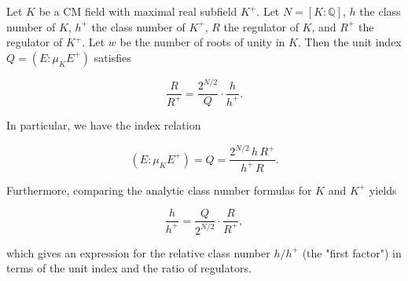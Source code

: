 Let $K$ be a CM field with maximal real subfield $K^+$. Let $N = [K : \mathbb{Q}]$, $h$ the class number of $K$, $h^+$ the class number of $K^+$, $R$ the regulator of $K$, and $R^+$ the regulator of $K^+$. Let $w$ be the number of roots of unity in $K$. Then the unit index $Q = (E : \mu_K E^+)$ satisfies

$$\frac{R}{R^+} = \frac{2^{N/2}}{Q} \cdot \frac{h}{h^+}.$$

In particular, we have the index relation

$$\left( E : \mu_K E^+ \right) = Q = \frac{2^{N/2} \, h \, R^+}{h^+ \, R}.$$

Furthermore, comparing the analytic class number formulas for $K$ and $K^+$ yields

$$\frac{h}{h^+} = \frac{Q}{2^{N/2}} \cdot \frac{R}{R^+},$$

which gives an expression for the relative class number $h/h^+$ (the "first factor") in terms of the unit index and the ratio of regulators.
